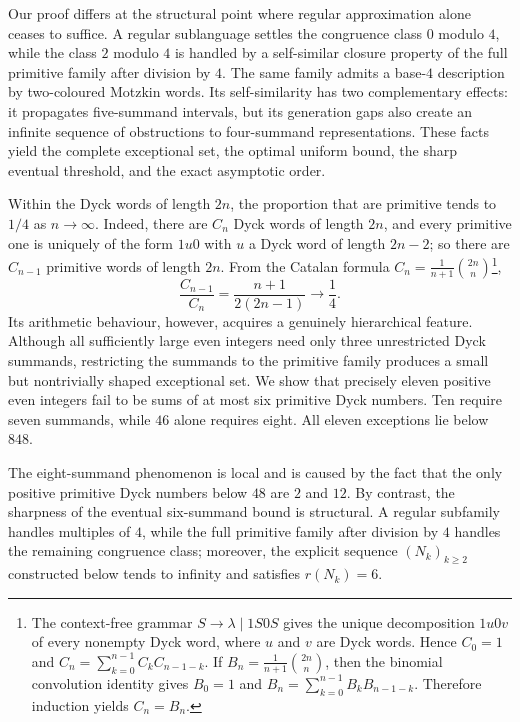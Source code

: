 \documentclass[12pt]{article}
\theoremstyle{plain}
\theoremstyle{definition}
\theoremstyle{plain}
\begin{document}
Our proof differs at the structural point where regular approximation
alone ceases to suffice.  A regular sublanguage settles the congruence
class $0$ modulo $4$, while the class $2$ modulo $4$ is handled by a
self-similar closure property of the full primitive family after division
by $4$.  The same family admits a base-$4$ description by two-coloured
Motzkin words.  Its self-similarity has two complementary effects: it
propagates five-summand intervals, but its generation gaps also create an
infinite sequence of obstructions to four-summand representations.  These
facts yield the complete exceptional set, the optimal uniform bound, the
sharp eventual threshold, and the exact asymptotic order.

Within the Dyck words of length $2n$, the proportion that are primitive
tends to $1/4$ as $n\to\infty$.  Indeed, there are $C_n$ Dyck words of
length $2n$, and every primitive one is uniquely of the form $1u0$ with
$u$ a Dyck word of length $2n-2$; so there are $C_{n-1}$ primitive words
of length $2n$.  From the Catalan formula
$C_n=\frac1{n+1}\binom{2n}{n}$\footnote{The context-free grammar
$S\to\lambda\mid 1S0S$ gives the unique decomposition $1u0v$ of every
nonempty Dyck word, where $u$ and $v$ are Dyck words.  Hence $C_0=1$ and
$C_n=\sum_{k=0}^{n-1}C_kC_{n-1-k}$.  If
$B_n=\frac{1}{n+1}\binom{2n}{n}$, then the binomial convolution identity gives
$B_0=1$ and $B_n=\sum_{k=0}^{n-1}B_kB_{n-1-k}$.  Therefore induction yields
$C_n=B_n$.},
\[
 \frac{C_{n-1}}{C_n}=\frac{n+1}{2(2n-1)}\longrightarrow\frac14 .
\]
Its arithmetic behaviour, however, acquires a genuinely hierarchical
feature.  Although all sufficiently large even integers need only three
unrestricted Dyck summands, restricting the summands to the primitive family
produces a small but nontrivially shaped exceptional set.  We show that
precisely eleven positive even integers fail to be sums of at most six
primitive Dyck numbers.  Ten require seven summands, while $46$ alone
requires eight.  All eleven exceptions lie below $848$.

The eight-summand phenomenon is local and is caused by the fact that the only
positive primitive Dyck numbers below $48$ are $2$ and $12$.  By contrast,
the sharpness of the eventual six-summand bound is structural.  A regular
subfamily handles multiples of $4$, while the full primitive family after
division by $4$ handles the remaining congruence class; moreover, the
explicit sequence $(N_k)_{k\geq2}$ constructed below tends to infinity and
satisfies $r(N_k)=6$.
\end{document}
